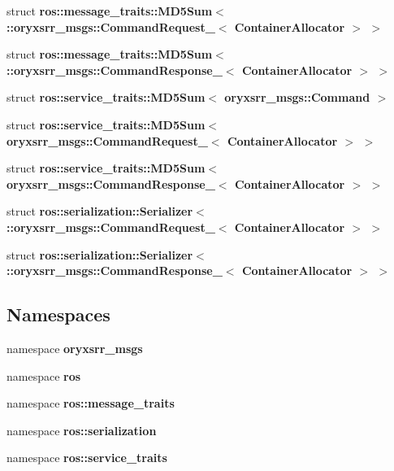 \begin{DoxyCompactItemize}
\item 
struct {\bf ros\-::message\-\_\-traits\-::\-M\-D5\-Sum$<$ \-::oryxsrr\-\_\-msgs\-::\-Command\-Request\-\_\-$<$ Container\-Allocator $>$ $>$}
\item 
struct {\bf ros\-::message\-\_\-traits\-::\-M\-D5\-Sum$<$ \-::oryxsrr\-\_\-msgs\-::\-Command\-Response\-\_\-$<$ Container\-Allocator $>$ $>$}
\item 
struct {\bf ros\-::service\-\_\-traits\-::\-M\-D5\-Sum$<$ oryxsrr\-\_\-msgs\-::\-Command $>$}
\item 
struct {\bf ros\-::service\-\_\-traits\-::\-M\-D5\-Sum$<$ oryxsrr\-\_\-msgs\-::\-Command\-Request\-\_\-$<$ Container\-Allocator $>$ $>$}
\item 
struct {\bf ros\-::service\-\_\-traits\-::\-M\-D5\-Sum$<$ oryxsrr\-\_\-msgs\-::\-Command\-Response\-\_\-$<$ Container\-Allocator $>$ $>$}
\item 
struct {\bf ros\-::serialization\-::\-Serializer$<$ \-::oryxsrr\-\_\-msgs\-::\-Command\-Request\-\_\-$<$ Container\-Allocator $>$ $>$}
\item 
struct {\bf ros\-::serialization\-::\-Serializer$<$ \-::oryxsrr\-\_\-msgs\-::\-Command\-Response\-\_\-$<$ Container\-Allocator $>$ $>$}
\end{DoxyCompactItemize}
\subsection*{\-Namespaces}
\begin{DoxyCompactItemize}
\item 
namespace {\bf oryxsrr\-\_\-msgs}
\item 
namespace {\bf ros}
\item 
namespace {\bf ros\-::message\-\_\-traits}
\item 
namespace {\bf ros\-::serialization}
\item 
namespace {\bf ros\-::service\-\_\-traits}
\end{DoxyCompactItemize}
